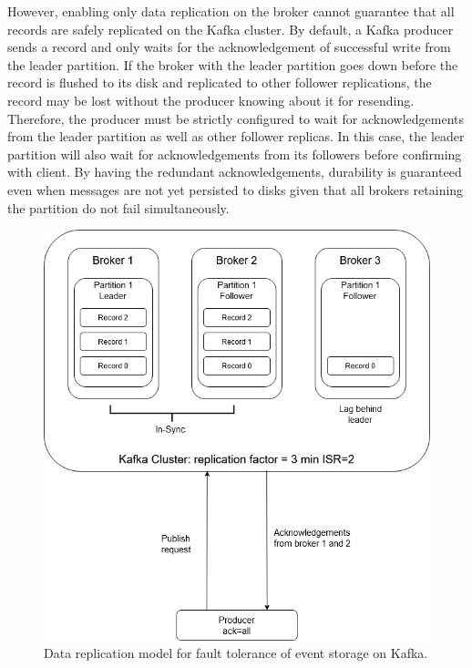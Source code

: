 However, enabling only data replication on the broker cannot guarantee that all records are safely replicated on the Kafka cluster.  By default, a Kafka producer sends a record and only waits for the acknowledgement of successful write from the leader partition. If the broker with the leader partition goes down before the record is flushed to its disk and replicated to other follower replications, the record may be lost without the producer knowing about it for resending. Therefore, the producer must be strictly configured to wait for acknowledgements from the leader partition as well as other follower replicas. In this case, the leader partition will also wait for acknowledgements from its followers before confirming with client. By having the redundant acknowledgements, durability is guaranteed even when messages are not yet persisted to disks given that all brokers retaining the partition do not fail simultaneously. 
\begin{figure}[h]
	\centering
	\includegraphics[width=12cm]{images/ft-eventstorage-kafka.png}
	\caption{Data replication model for fault tolerance of event storage on Kafka.}
	\label{fig:fteventstorekafka}
\end{figure}

